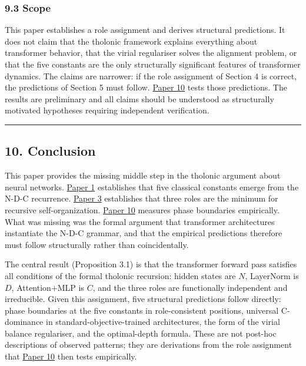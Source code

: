 \documentclass[
  11pt,
  letterpaper,
]{article}
\begin{document}
\subsubsection{9.3 Scope}\label{scope}

This paper establishes a role assignment and derives structural
predictions. It does not claim that the tholonic framework explains
everything about transformer behavior, that the virial regulariser
solves the alignment problem, or that the five constants are the only
structurally significant features of transformer dynamics. The claims
are narrower: if the role assignment of Section 4 is correct, the
predictions of Section 5 must follow.
\href{https://github.com/baardev/truevalue/blob/main/docnav/Research/papers/10_tholonic-neural-architecture/10_tholonic-neural-architecture.pdf}{Paper
10} tests those predictions. The results are preliminary and all claims
should be understood as structurally motivated hypotheses requiring
independent verification.

\begin{center}\rule{0.5\linewidth}{0.5pt}\end{center}

\subsection{10. Conclusion}\label{conclusion}

This paper provides the missing middle step in the tholonic argument
about neural networks.
\href{https://github.com/baardev/truevalue/blob/main/docnav/Research/papers/1_recursive-tholonic-five-constants/1_recursive-tholonic-five-constants.pdf}{Paper
1} establishes that five classical constants emerge from the N-D-C
recurrence.
\href{https://github.com/baardev/truevalue/blob/main/docnav/Research/papers/3_minimal-recursive-triadic-framework/3_minimal-recursive-triadic-framework.pdf}{Paper
3} establishes that three roles are the minimum for recursive
self-organization.
\href{https://github.com/baardev/truevalue/blob/main/docnav/Research/papers/10_tholonic-neural-architecture/10_tholonic-neural-architecture.pdf}{Paper
10} measures phase boundaries empirically. What was missing was the
formal argument that transformer architectures instantiate the N-D-C
grammar, and that the empirical predictions therefore must follow
structurally rather than coincidentally.

The central result (Proposition 3.1) is that the transformer forward
pass satisfies all conditions of the formal tholonic recursion: hidden
states are \(N\), LayerNorm is \(D\), Attention+MLP is \(C\), and the
three roles are functionally independent and irreducible. Given this
assignment, five structural predictions follow directly: phase
boundaries at the five constants in role-consistent positions, universal
C-dominance in standard-objective-trained architectures, the form of the
virial balance regulariser, and the optimal-depth formula. These are not
post-hoc descriptions of observed patterns; they are derivations from
the role assignment that
\href{https://github.com/baardev/truevalue/blob/main/docnav/Research/papers/10_tholonic-neural-architecture/10_tholonic-neural-architecture.pdf}{Paper
10} then tests empirically.
\end{document}
